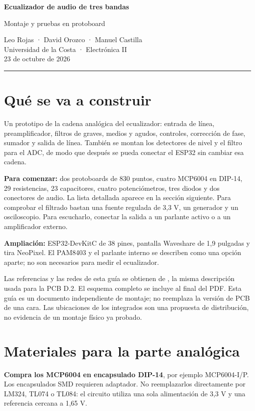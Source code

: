 \documentclass[10pt,a4paper]{article}
\newcommand{\red}[1]{\texttt{\detokenize{#1}}}
\begin{document}
\begin{center}
{\LARGE\bfseries Ecualizador de audio de tres bandas}\par
{\Large Montaje y pruebas en protoboard}\par
\vspace{4mm}
Leo Rojas · David Orozco · Manuel Castilla\\
Universidad de la Costa · Electrónica II\\23 de octubre de 2026
\end{center}
{\color{cucrojo}\rule{\linewidth}{1pt}}

\section{Qué se va a construir}
Un prototipo de la cadena analógica del ecualizador: entrada de línea, preamplificador, filtros de graves, medios y agudos, controles, corrección de fase, sumador y salida de línea. También se montan los detectores de nivel y el filtro para el ADC, de modo que después se pueda conectar el ESP32 sin cambiar esa cadena.

\textbf{Para comenzar:} dos protoboards de 830 puntos, cuatro MCP6004 en DIP-14, 29 resistencias, 23 capacitores, cuatro potenciómetros, tres diodos y dos conectores de audio. La lista detallada aparece en la sección siguiente. Para comprobar el filtrado bastan una fuente regulada de 3,3 V, un generador y un osciloscopio. Para escucharlo, conectar la salida a un parlante activo o a un amplificador externo.

\textbf{Ampliación:} ESP32-DevKitC de 38 pines, pantalla Waveshare de 1,9 pulgadas y tira NeoPixel. El PAM8403 y el parlante interno se describen como una opción aparte; no son necesarios para medir el ecualizador.

Las referencias y las redes de esta guía se obtienen de \red{herramientas/circuito.py}, la misma descripción usada para la PCB D.2. El esquema completo se incluye al final del PDF. Esta guía es un documento independiente de montaje; no reemplaza la versión de PCB de una cara. Las ubicaciones de los integrados son una propuesta de distribución, no evidencia de un montaje físico ya probado.

\section{Materiales para la parte analógica}
\textbf{Compra los MCP6004 en encapsulado DIP-14}, por ejemplo MCP6004-I/P. Los encapsulados SMD requieren adaptador. No reemplazarlos directamente por LM324, TL074 o TL084: el circuito utiliza una sola alimentación de 3,3 V y una referencia cercana a 1,65 V.
\end{document}
